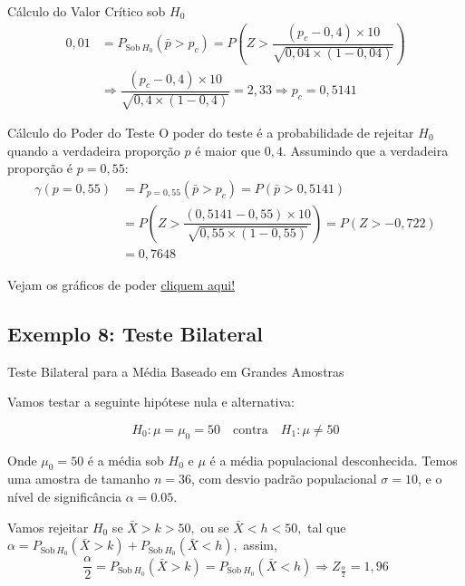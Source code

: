 \documentclass[12pt]{beamer}
\begin{document}
\begin{frame}{}
	\begin{block}{Cálculo do Valor Crítico sob $H_{0}$}
		\justifying
		\begin{align*}
			0,01&=P_{\text{Sob}~H_{0}}(\bar{p}>p_{c})=P(Z>\dfrac{(p_{c}-0,4)\times10}{\sqrt{0,04\times(1-0,04)}})\\
			&\Rightarrow \dfrac{(p_{c}-0,4)\times10}{\sqrt{0,4\times(1-0,4)}}=2,33\Rightarrow p_{c}=0,5141
		\end{align*}
	\end{block}
	\pause
	\begin{block}{Cálculo do Poder do Teste}
		\justifying
		O poder do teste é a probabilidade de rejeitar $H_0$ quando a verdadeira proporção $p$ é maior que $0,4$. Assumindo que a verdadeira proporção é $p=0,55:$
		\begin{align*}
			\gamma(p=0,55)&=P_{p=0,55}(\bar{p}>p_{c})=P(\bar{p}>0,5141)\\
			&=P(Z>\dfrac{(0,5141-0,55)\times10}{\sqrt{0,55\times(1-0,55)}})=P(Z>-0,722)\\
			&=0,7648
		\end{align*}
	\end{block}
\end{frame}

\begin{frame}{}
	\begin{block}{}
		Vejam os gráficos de poder \href{https://est711.shinyapps.io/FuncaoPoder/}{cliquem aqui!}
	\end{block}
\end{frame}

\subsection{Exemplo 8: Teste Bilateral}
\begin{frame}{Teste Bilateral para a Média Baseado em Grandes Amostras}
	\begin{block}{}
		\justifying
		Vamos testar a seguinte hipótese nula e alternativa:
		
		\[
		H_0: \mu = \mu_0 = 50 \quad \text{contra} \quad H_1: \mu \neq 50
		\]
		
		Onde \( \mu_0 = 50 \) é a média sob \( H_0 \) e \( \mu \) é a média populacional desconhecida. Temos uma amostra de tamanho \( n = 36 \), com desvio padrão populacional \( \sigma = 10 \), e o nível de significância \( \alpha = 0.05 \).
		
	\end{block}
	\pause
	\begin{block}{}
		\justifying
		Vamos rejeitar $H_0$ se $\bar{X}>k>50,$ ou se $\bar{X}<h<50,$ tal que $\alpha=P_{\text{Sob}~H_{0}}(\bar{X}>k)+P_{\text{Sob}~H_{0}}(\bar{X}<h),$ assim,
		\[
		\dfrac{\alpha}{2}=P_{\text{Sob}~H_{0}}(\bar{X}>k)=P_{\text{Sob}~H_{0}}(\bar{X}<h)\Rightarrow Z_{\frac{\alpha}{2}} = 1,96
		\]	
	\end{block}
\end{frame}
\end{document}
